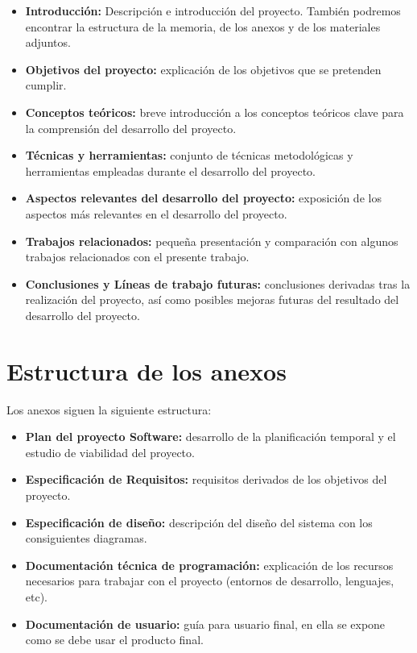 \begin{itemize}
\item
  \textbf{Introducción:} Descripción e introducción del proyecto. También podremos encontrar la estructura de la memoria, de los anexos y de los materiales adjuntos.
\item
  \textbf{Objetivos del proyecto:} explicación de los objetivos que se pretenden cumplir. 
\item
  \textbf{Conceptos teóricos:} breve introducción a los conceptos teóricos clave para la comprensión del desarrollo del proyecto.
\item
  \textbf{Técnicas y herramientas:} conjunto de técnicas metodológicas y
  herramientas empleadas durante el desarrollo del proyecto.
\item
  \textbf{Aspectos relevantes del desarrollo del proyecto:} exposición de los aspectos más relevantes en el desarrollo del proyecto.
\item
  \textbf{Trabajos relacionados:} pequeña presentación y comparación con algunos trabajos relacionados con el presente trabajo.
\item
  \textbf{Conclusiones y Líneas de trabajo futuras:} conclusiones derivadas tras la realización del proyecto, así como posibles mejoras futuras del resultado del desarrollo del proyecto.
\end{itemize}

\section{Estructura de los anexos}

Los anexos siguen la siguiente estructura:

\begin{itemize}
\item
  \textbf{Plan del proyecto Software:} desarrollo de la planificación temporal y el estudio de viabilidad del proyecto.
\item
  \textbf{Especificación de Requisitos:} requisitos derivados de los objetivos del proyecto.
\item
  \textbf{Especificación de diseño:} descripción del diseño del sistema con los consiguientes diagramas.
\item
  \textbf{Documentación técnica de programación:} explicación de los recursos necesarios para trabajar con el proyecto (entornos de desarrollo, lenguajes, etc).
\item
  \textbf{Documentación de usuario:} guía para usuario final, en ella se expone como se debe usar el producto final.
\end{itemize}

